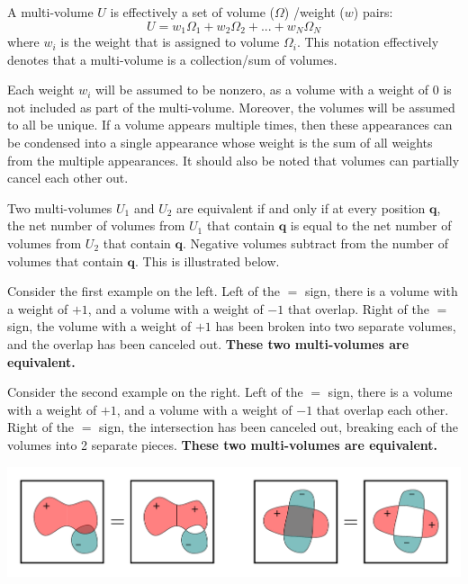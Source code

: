 \documentclass{book}
\begin{document}
\vspace{2mm}

A multi-volume \(U\) is effectively a set of volume (\(\Omega\)) /weight (\(w\)) pairs:
\[U = w_1 \Omega_1 + w_2 \Omega_2 + ... + w_N \Omega_N\]
where \(w_i\) is the weight that is assigned to volume \(\Omega_i\). This notation effectively denotes that a multi-volume is a collection/sum of volumes.

Each weight \(w_i\) will be assumed to be nonzero, as a volume with a weight of 0 is not included as part of the multi-volume. Moreover, the volumes will be assumed to all be unique. If a volume appears multiple times, then these appearances can be condensed into a single appearance whose weight is the sum of all weights from the multiple appearances. It should also be noted that volumes can partially cancel each other out.  

Two multi-volumes \(U_1\) and \(U_2\) are equivalent if and only if at every position \(\mathbf{q}\), the net number of volumes from \(U_1\) that contain \(\mathbf{q}\) is equal to the net number of volumes from \(U_2\) that contain \(\mathbf{q}\). Negative volumes subtract from the number of volumes that contain \(\mathbf{q}\). This is illustrated below. 

Consider the first example on the left. Left of the \(=\) sign, there is a volume with a weight of \(+1\), and a volume with a weight of \(-1\) that overlap. Right of the \(=\) sign, the volume with a weight of \(+1\) has been broken into two separate volumes, and the overlap has been canceled out. {\bf These two multi-volumes are equivalent.} 

Consider the second example on the right. Left of the \(=\) sign, there is a volume with a weight of \(+1\), and a volume with a weight of \(-1\) that overlap each other. Right of the \(=\) sign, the intersection has been canceled out, breaking each of the volumes into 2 separate pieces. {\bf These two multi-volumes are equivalent.}  

\begin{center}
\includegraphics[scale = 0.5]{Multi-structures/Multivolumes/multi-volume_decomposition}
\end{center}
\end{document}
